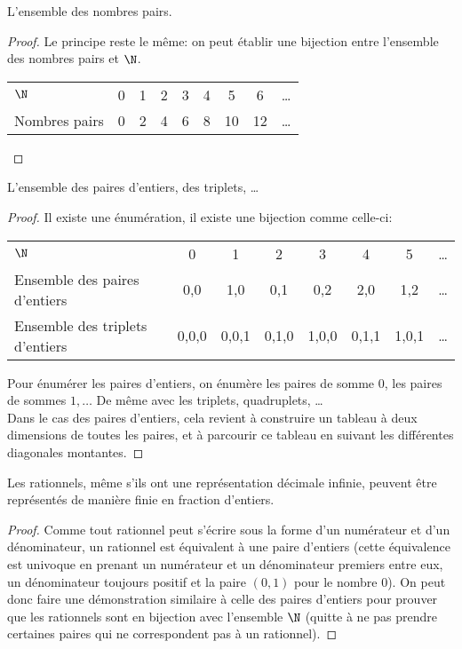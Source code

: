 \begin{myexem}
 L'ensemble des nombres pairs.
  \begin{proof}
  Le principe reste le même: on peut établir une bijection entre l'ensemble des nombres pairs et $\N$.

   \begin{tabular}{ l c c c c c c c r }
    $\N$ & 0 & 1 & 2  & 3 & 4 & 5 & 6 & \ldots \\
      Nombres pairs & 0 & 2 & 4 & 6 & 8 & 10 & 12  & \ldots \\
    \end{tabular}
  \end{proof}
\end{myexem}

\begin{myexem}
\label{exem:paire_entiers}
  L'ensemble des paires d'entiers, des triplets, \ldots
    \begin{proof}
        Il existe une énumération, il existe une bijection comme celle-ci:

		\begin{tabular}{ l c c  c  c c c  r }
			$\N$  & 0 & 1 & 2  & 3 & 4 & 5 & \ldots  \\
			Ensemble des paires d'entiers & {0,0} & {1,0} & {0,1} & {0,2} & {2,0} & {1,2}  & \ldots \\
			Ensemble des triplets d'entiers & {0,0,0} & {0,0,1} & {0,1,0} & {1,0,0} & {0,1,1} & {1,0,1}  & \ldots \\

		\end{tabular}

	Pour énumérer les paires d'entiers, on énumère les paires de somme 0, les paires de sommes $1, \ldots$ De même avec les triplets, quadruplets, \dots \\
	Dans le cas des paires d'entiers, cela revient à construire un tableau à deux dimensions de toutes les paires, et à parcourir ce tableau en suivant les différentes diagonales montantes.
    \end{proof}
\end{myexem}

\begin{myexem}
 Les rationnels, même s'ils ont une représentation décimale infinie, peuvent être représentés de manière finie en fraction d'entiers.
	 \begin{proof}
	 	 Comme tout rationnel peut s'écrire sous la forme d'un numérateur et d'un dénominateur, un rationnel est équivalent à une paire d'entiers (cette équivalence est univoque en prenant un numérateur et un dénominateur premiers entre eux, un dénominateur toujours positif et la paire $(0,1)$ pour le nombre $0$). On peut donc faire une démonstration similaire à celle des paires d'entiers pour prouver que les rationnels sont en bijection avec l'ensemble $\N$ (quitte à ne pas prendre certaines paires qui ne correspondent pas à un rationnel).
	 \end{proof}
 \end{myexem}

